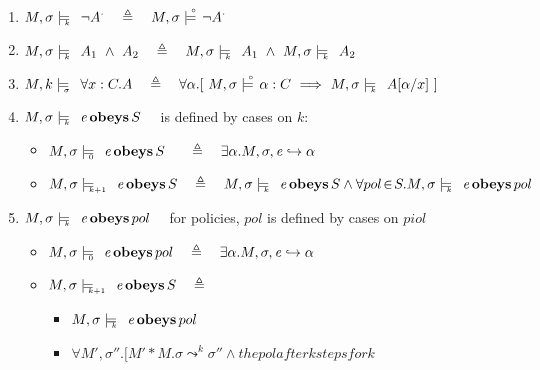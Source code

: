 \begin{definition}
\begin{enumerate}
 
  \item
$\satisfiesAK{M}{\sigma} k {\neg \ba A}\ \ \ \triangleq \ \ \   \satisfiesAB{M}{\sigma}{\neg \ba A}$
\item
$\satisfiesAK{M}{\sigma} k {\wf A_1\ \wedge\ \wf A_2}\ \ \ \triangleq \ \ \   \satisfiesAK{M}{\sigma} k {\wf A_1}\ \wedge\ \satisfiesAK{M}{\sigma} k {\wf A_2}$
\item
\label{quant1}
$\satisfiesAK{M} k {\sigma}{\all{x:C}{\wf A}} \ \ \ \triangleq \ \ \   
\forall \alpha.[\   \satisfiesAB {M}{\sigma} {\alpha:C}  \ \Longrightarrow   \ \satisfiesAK{M}{\sigma}  k {\wf A[\alpha/x]} \ ] $
\item
$M , \sigma \models\!\!\!\!_{_{k}}\ \  {\mathit{e}\, \textbf{obeys} \, S}$ \ \ is defined by cases on $k$:
\begin{itemize}
\item
$M , \sigma \models\!\!\!\!_{_{0}}\ \  {\mathit{e}\, \textbf{obeys} \, S}  \ \ \ \ \ \triangleq \ \ \   \exists \alpha. M, \sigma, {\mathit{e}} \hookrightarrow \alpha$
\item
$\satisfiesAK{M} \sigma  {k+1} {\obeys {\re} {S}}  \ \ \ \triangleq \ \ \   \satisfiesAK{M} \sigma {k} {\obeys {\re} {S}} \wedge \forall pol\! \in\! S. \satisfiesAK{M}\sigma  {k} {\obeys {\re} {pol}}$
\end{itemize}
\item
$M , \sigma \models\!\!\!\!_{_{k}}\ \  {\mathit{e}\, \textbf{obeys} \, pol}$ \ \ for policies, $pol$  is defined by cases on $piol$
\begin{itemize}
\item
$M , \sigma \models\!\!\!\!_{_{0}}\ \  {\mathit{e}\, \textbf{obeys} \, pol}  \ \ \ \triangleq \ \ \   \exists \alpha. M, \sigma, {\mathit{e}} \hookrightarrow \alpha$
\item
$M , \sigma \models\!\!\!\!_{_{k+1}}\ \  {\mathit{e}\, \textbf{obeys} \, S}  \ \ \ \triangleq \ \ \ $
\begin{itemize}
\item
 $ M , \sigma \models\!\!\!\!_{_{k}}\ \  {\mathit{e}\, \textbf{obeys} \, pol} $
 \item
$\forall M', \sigma''.[ M'*M. \sigma \leadsto^k \sigma'' \wedge  the pol after k steps for k $
\end{itemize}
\end{itemize}
\end{enumerate}

 \end{definition} 
 
 
 
 
